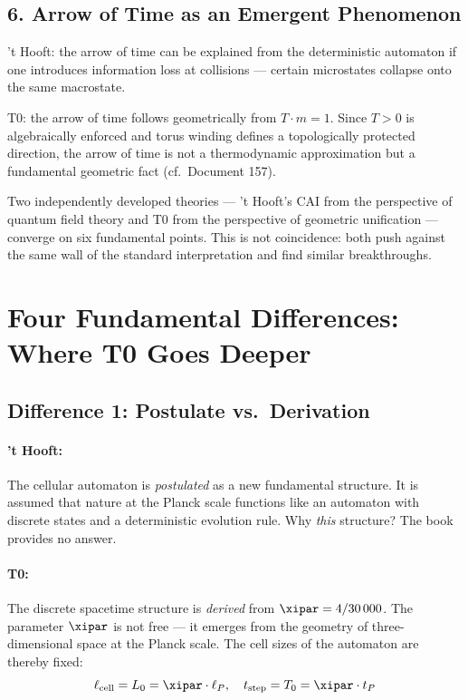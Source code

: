 \subsection{6. Arrow of Time as an Emergent Phenomenon}

't Hooft: the arrow of time can be explained from the deterministic automaton
if one introduces information loss at collisions — certain microstates collapse
onto the same macrostate.

T0: the arrow of time follows geometrically from $T \cdot m = 1$. Since $T > 0$
is algebraically enforced and torus winding defines a topologically protected
direction, the arrow of time is not a thermodynamic approximation but a
fundamental geometric fact (cf.\ Document 157).

\begin{discoveryBox}
    Two independently developed theories — 't Hooft's CAI from the perspective
    of quantum field theory and T0 from the perspective of geometric unification —
    converge on six fundamental points. This is not coincidence: both push against
    the same wall of the standard interpretation and find similar breakthroughs.
\end{discoveryBox}

\clearpage

\section{Four Fundamental Differences: Where T0 Goes Deeper}
\label{sec:differences}

\subsection{Difference 1: Postulate vs.\ Derivation}

\paragraph{'t Hooft:} The cellular automaton is \emph{postulated} as a new
fundamental structure. It is assumed that nature at the Planck scale functions
like an automaton with discrete states and a deterministic evolution rule.
Why \emph{this} structure? The book provides no answer.

\paragraph{T0:} The discrete spacetime structure is \emph{derived} from
$\xipar = 4/30\,000$. The parameter $\xipar$ is not free — it emerges from the
geometry of three-dimensional space at the Planck scale. The cell sizes of the
automaton are thereby fixed:
\begin{equation}
    \ell_{\text{cell}} = L_0 = \xipar \cdot \ell_P, \quad
    t_{\text{step}} = T_0 = \xipar \cdot t_P
    \label{eq:cell_size}
\end{equation}

